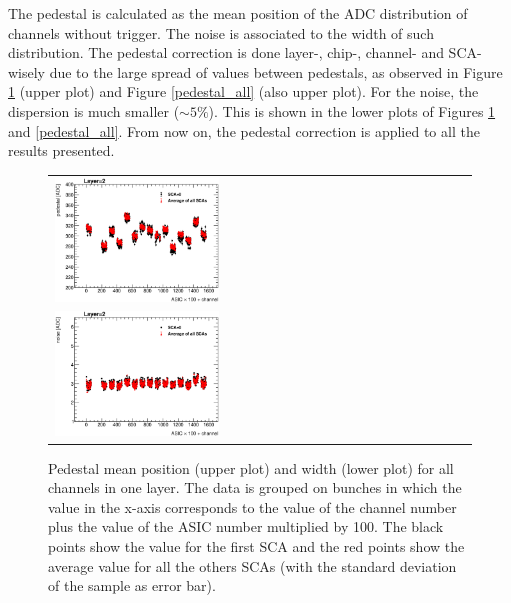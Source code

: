 \documentclass[final,3p,times,twocolumn]{elsarticle}
\begin{document}
The pedestal is calculated as the mean position of
the ADC distribution of channels without trigger. The noise is
associated to the width of such distribution.
The pedestal correction is done layer-, chip-, channel- and SCA-wisely due to the large spread of values between pedestals, as observed in 
Figure \ref{pedestal_layer} (upper plot) and Figure \ref{pedestal_all} (also upper plot).
For the noise, the dispersion is much smaller ($\sim 5 \%$). This is shown in the lower plots of Figures \ref{pedestal_layer} and \ref{pedestal_all}.
From now on, the pedestal correction is applied to all the results presented.

\begin{figure}[!t]
  \centering
  \begin{tabular}{l}
    \includegraphics[width=0.4\textwidth]{../figs/pedestal/ped_mean_layer2.eps} \\
    \includegraphics[width=0.4\textwidth]{../figs/pedestal/width_mean_layer2.eps}
  \end{tabular}
  \caption{Pedestal mean position (upper plot) and width (lower plot) for all channels in one layer. The data is grouped on bunches in which the value in the x-axis
    corresponds to the value of the channel number plus the value of the ASIC number multiplied by 100. The black points show the value for the first SCA
    and the red points show the average value for all the others SCAs (with the standard deviation of the sample as error bar).}
\label{pedestal_layer}
\end{figure}
\end{document}
